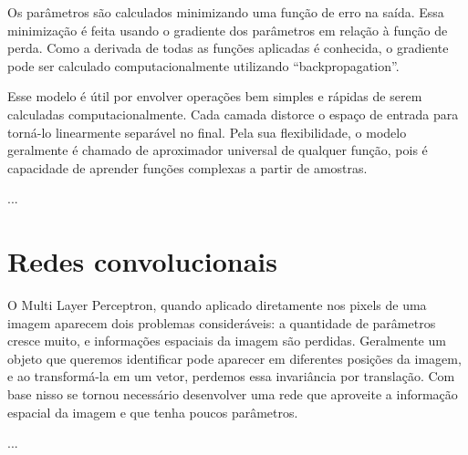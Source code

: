 
Os parâmetros são calculados minimizando
uma função de erro na saída. Essa minimização
é feita usando o gradiente dos parâmetros
em relação à função de perda. Como a derivada
de todas as funções aplicadas é conhecida,
o gradiente pode ser calculado computacionalmente
utilizando ``backpropagation''.




Esse modelo é útil por envolver operações
bem simples e rápidas de serem calculadas
computacionalmente. Cada camada distorce
o espaço de entrada para torná-lo linearmente
separável no final. Pela sua flexibilidade,
o modelo geralmente é chamado de aproximador 
universal de qualquer função, pois
é capacidade de aprender funções complexas
a partir de amostras.


...

\section{Redes convolucionais}



O Multi Layer Perceptron,
quando aplicado diretamente
nos pixels de uma imagem aparecem
dois problemas consideráveis:
a quantidade de parâmetros cresce muito,
e informações espaciais da imagem
são perdidas. Geralmente um objeto
que queremos identificar pode aparecer
em diferentes posições da imagem,
e ao transformá-la em um vetor,
perdemos essa invariância por translação.
Com base nisso se tornou necessário
desenvolver uma rede que aproveite
a informação espacial da imagem
e que tenha poucos parâmetros.



...



